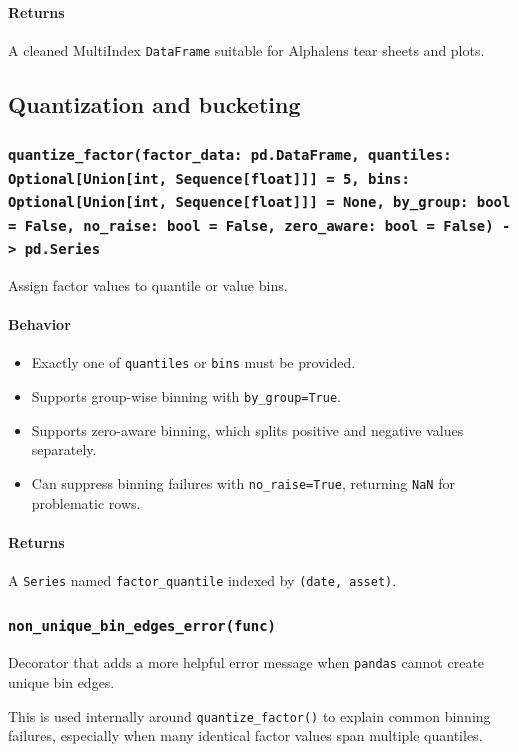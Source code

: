 \documentclass[11pt]{article}
\begin{document}
\paragraph{Returns}
A cleaned MultiIndex \texttt{DataFrame} suitable for Alphalens tear sheets and plots.

\subsection{Quantization and bucketing}

\subsubsection{\texttt{quantize\_factor(factor\_data: pd.DataFrame, quantiles: Optional[Union[int, Sequence[float]]] = 5, bins: Optional[Union[int, Sequence[float]]] = None, by\_group: bool = False, no\_raise: bool = False, zero\_aware: bool = False) -> pd.Series}}
Assign factor values to quantile or value bins.

\paragraph{Behavior}
\begin{itemize}
  \item Exactly one of \texttt{quantiles} or \texttt{bins} must be provided.
  \item Supports group-wise binning with \texttt{by\_group=True}.
  \item Supports zero-aware binning, which splits positive and negative values separately.
  \item Can suppress binning failures with \texttt{no\_raise=True}, returning \texttt{NaN} for problematic rows.
\end{itemize}

\paragraph{Returns}
A \texttt{Series} named \texttt{factor\_quantile} indexed by \texttt{(date, asset)}.

\subsubsection{\texttt{non\_unique\_bin\_edges\_error(func)}}
Decorator that adds a more helpful error message when \texttt{pandas} cannot create unique bin edges.

This is used internally around \texttt{quantize\_factor()} to explain common binning failures, especially when many identical factor values span multiple quantiles.
\end{document}
